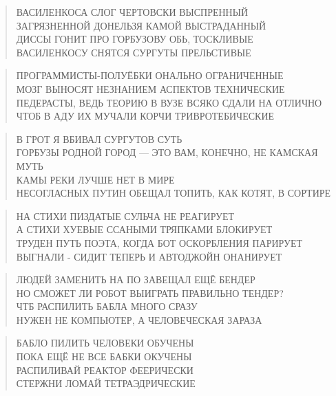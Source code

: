 \poemtitle{***}
\begin{verse}
ВАСИЛЕНКОСА СЛОГ ЧЕРТОВСКИ ВЫСПРЕННЫЙ\\
ЗАГРЯЗНЕННОЙ ДОНЕЛЬЗЯ КАМОЙ ВЫСТРАДАННЫЙ\\
ДИССЫ ГОНИТ ПРО ГОРБУЗОВУ ОБЬ, ТОСКЛИВЫЕ\\
ВАСИЛЕНКОСУ СНЯТСЯ СУРГУТЫ ПРЕЛЬСТИВЫЕ
\end{verse}

\poemtitle{***}
\begin{verse}
ПРОГРАММИСТЫ-ПОЛУЁБКИ ОНАЛЬНО ОГРАНИЧЕННЫЕ\\
МОЗГ ВЫНОСЯТ НЕЗНАНИЕМ АСПЕКТОВ ТЕХНИЧЕСКИЕ\\
ПЕДЕРАСТЫ, ВЕДЬ ТЕОРИЮ В ВУЗЕ ВСЯКО СДАЛИ НА ОТЛИЧНО\\
ЧТОБ В АДУ ИХ МУЧАЛИ КОРЧИ ТРИВРОТЕБИЧЕСКИЕ
\end{verse}

\poemtitle{***}
\begin{verse}
В ГРОТ Я ВБИВАЛ СУРГУТОВ СУТЬ\\
ГОРБУЗЫ РОДНОЙ ГОРОД — ЭТО ВАМ, КОНЕЧНО, НЕ КАМСКАЯ МУТЬ\\
КАМЫ РЕКИ ЛУЧШЕ НЕТ В МИРЕ\\
НЕСОГЛАСНЫХ ПУТИН ОБЕЩАЛ ТОПИТЬ, КАК КОТЯТ, В СОРТИРЕ
\end{verse}

\poemtitle{***}
\begin{verse}
НА СТИХИ ПИЗДАТЫЕ СУЛЬЧА НЕ РЕАГИРУЕТ\\
А СТИХИ ХУЕВЫЕ ССАНЫМИ ТРЯПКАМИ БЛОКИРУЕТ\\
ТРУДЕН ПУТЬ ПОЭТА, КОГДА БОТ ОСКОРБЛЕНИЯ ПАРИРУЕТ\\
ВЫГНАЛИ - СИДИТ ТЕПЕРЬ И АВТОДЖОЙН ОНАНИРУЕТ
\end{verse}

\poemtitle{***}
\begin{verse}
ЛЮДЕЙ ЗАМЕНИТЬ НА ПО ЗАВЕЩАЛ ЕЩЁ БЕНДЕР\\
НО СМОЖЕТ ЛИ РОБОТ ВЫИГРАТЬ ПРАВИЛЬНО ТЕНДЕР?\\
ЧТБ РАСПИЛИТЬ БАБЛА МНОГО СРАЗУ\\
НУЖЕН НЕ КОМПЬЮТЕР, А ЧЕЛОВЕЧЕСКАЯ ЗАРАЗА
\end{verse}

\poemtitle{***}
\begin{verse}
БАБЛО ПИЛИТЬ ЧЕЛОВЕКИ ОБУЧЕНЫ\\
ПОКА ЕЩЁ НЕ ВСЕ БАБКИ ОКУЧЕНЫ\\
РАСПИЛИВАЙ РЕАКТОР ФЕЕРИЧЕСКИ\\
СТЕРЖНИ ЛОМАЙ ТЕТРАЭДРИЧЕСКИЕ
\end{verse}

